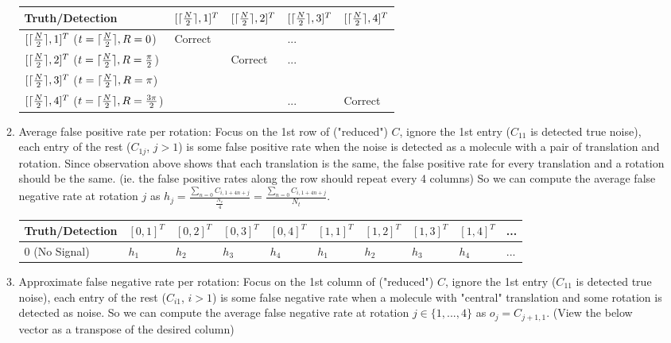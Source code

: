 \documentclass[11pt]{article}
\DeclarePairedDelimiter{\ceil}{\lceil}{\rceil}
\begin{document}
\begin{enumerate}
\begin{enumerate}
                \begin{tabular}{l|l|l|l|l}
                    Truth/Detection&$[\ceil{\frac{N}{2}}, 1]^T$&$[\ceil{\frac{N}{2}}, 2]^T$&$[\ceil{\frac{N}{2}}, 3]^T$&$[\ceil{\frac{N}{2}}, 4]^T$\\\hline
                    $[\ceil{\frac{N}{2}}, 1]^T$ ($t=\ceil{\frac{N}{2}},R=0$)&Correct& &...& \\\hline
                    $[\ceil{\frac{N}{2}}, 2]^T$ ($t=\ceil{\frac{N}{2}},R=\frac{\pi}{2}$)& &Correct&...& \\\hline
                    $[\ceil{\frac{N}{2}}, 3]^T$ ($t=\ceil{\frac{N}{2}},R=\pi$)& & & & \\\hline
                    $[\ceil{\frac{N}{2}}, 4]^T$ ($t=\ceil{\frac{N}{2}},R=\frac{3\pi}{2}$)& & &...&Correct\\\hline
                \end{tabular}
                
                \item Average false positive rate per rotation: Focus on the 1st row of ("reduced") $C$, ignore the 1st entry ($C_{11}$ is detected true noise), each entry of the rest ($C_{1j}$, $j>1$) is some false positive rate when the noise is detected as a molecule with a pair of translation and rotation. Since observation above shows that each translation is the same, the false positive rate for every translation and a rotation should be the same. (ie. the false positive rates along the row should repeat every 4 columns) So we can compute the average false negative rate at rotation $j$ as $h_j = \frac{\sum_{n=0} C_{i, 1+4n + j}}{\frac{N_c}{4}}=\frac{\sum_{n=0} C_{i, 1+4n + j}}{N_t}$.
                
                \begin{tabular}{l|l|l|l|l|l|l|l|l|l}
                    Truth/Detection&$[0, 1]^T$&$[0, 2]^T$&$[0, 3]^T$&$[0, 4]^T$&$[1, 1]^T$&$[1, 2]^T$&$[1, 3]^T$&$[1, 4]^T$&...\\\hline
                    $0$ (No Signal)&$h_1$&$h_2$&$h_3$&$h_4$&$h_1$&$h_2$&$h_3$&$h_4$&... \\\hline
                \end{tabular}
                
                \item Approximate false negative rate per rotation: Focus on the 1st column of ("reduced") $C$, ignore the 1st entry ($C_{11}$ is detected true noise), each entry of the rest ($C_{i1}$, $i>1$) is some false negative rate when a molecule with "central" translation and some rotation is detected as noise. So we can compute the average false negative rate at rotation $j \in \{1,...,4\}$ as $o_j = C_{j+1, 1}$. (View the below vector as a transpose of the desired column)
                

\end{enumerate}
\end{enumerate}
\end{document}
